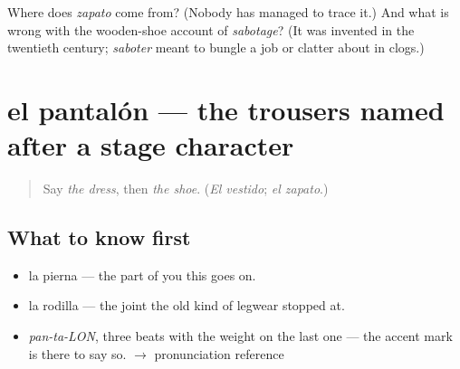 \begin{tcolorbox}[breakable,colback=teal!4,colframe=teal!35!black,title={Before you move on}]
Where does \emph{zapato} come from? (Nobody has managed to trace it.) And what is wrong with the wooden-shoe account of \emph{sabotage}? (It was invented in the twentieth century; \emph{saboter} meant to bungle a job or clatter about in clogs.)
\end{tcolorbox}
\section[el pantalón]{el pantalón — the trousers named after a stage character}

\label{lesson:ES-C360-pantalon}



\begin{quote}
Say \emph{the dress}, then \emph{the shoe}. (\emph{El vestido}; \emph{el zapato}.)
\end{quote}

\subsection*{What to know first}
\begin{itemize}
\raggedright
  \item la pierna — the part of you this goes on.
  \item la rodilla — the joint the old kind of legwear stopped at.
\end{itemize}

\begin{sounds}
\begin{itemize}
\raggedright
  \item \emph{pan-ta-LON}, three beats with the weight on the last one — the accent mark is there to say so. $\to$ pronunciation reference
\end{itemize}
\end{sounds}

